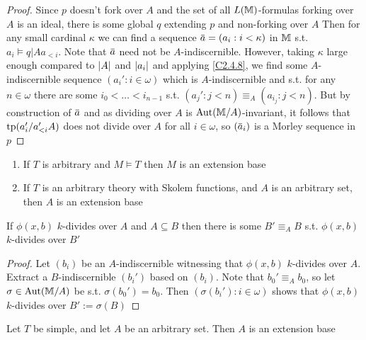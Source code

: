 \documentclass[11pt]{article}
\begin{document}
\begin{proof}
Since \(p\) doesn't fork over \(A\) and the set of all \(L(\mathbb{M})\)-formulas forking over \(A\) is
an ideal, there is some global \(q\) extending \(p\) and non-forking over \(A\)
Then for any small cardinal \(\kappa\) we can find a sequence \(\bara=(a_i:i<\kappa)\) in \(\mathbb{M}\)
s.t. \(a_i\vDash q|Aa_{<i}\). Note that \(\bara\) need not be \(A\)-indiscernible. However, taking
\(\kappa\) large enough compared to \(\abs{A}\) and \(\abs{a_i}\) and applying \ref{C2.4.8}, we find
some \(A\)-indiscernible sequence \((a_i':i\in\omega)\) which is \(A\)-indiscernible and s.t. for
any \(n\in\omega\) there are some \(i_0<\dots<i_{n-1}\) s.t. \((a_j':j<n)\equiv_A(a_{i_j}:j<n)\). But by
construction of \(\bara\) and as dividing over \(A\) is \(\operatorname{\text{Aut}}(\mathbb{M}/A)\)-invariant, it follows
that \(\operatorname{tp}(a_i'/a'_{<i}A)\) does not divide over \(A\) for all \(i\in\omega\), so \((\bara_i)\) is a
Morley sequence in \(p\)
\end{proof}

\begin{exercise}
\begin{enumerate}
\item If \(T\) is arbitrary and \(M\vDash T\) then \(M\) is an extension base
\item If \(T\) is an arbitrary theory with Skolem functions, and \(A\) is an arbitrary set,
then \(A\) is an extension base
\end{enumerate}
\end{exercise}

\begin{lemma}[]
\label{C3.5.8}
If \(\phi(x,b)\) \(k\)-divides over \(A\) and \(A\subseteq B\) then there is some \(B'\equiv_AB\)
s.t. \(\phi(x,b)\) \(k\)-divides over \(B'\)
\end{lemma}

\begin{proof}
Let \((b_i)\) be an \(A\)-indiscernible witnessing that \(\phi(x,b)\) \(k\)-divides over \(A\).
Extract a \(B\)-indiscernible \((b_i')\) based on \((b_i)\). \label{Problem11} Note that \(b_0'\equiv_Ab_0\), so
let \(\sigma\in\operatorname{\text{Aut}}(\mathbb{M}/A)\) be s.t. \(\sigma(b_0')=b_0\). Then \((\sigma(b_i'):i\in\omega)\) shows
that \(\phi(x,b)\) \(k\)-divides over \(B':=\sigma(B)\)
\end{proof}

\begin{theorem}[]
Let \(T\) be simple, and let \(A\) be an arbitrary set. Then \(A\) is an extension base
\end{theorem}
\end{document}
